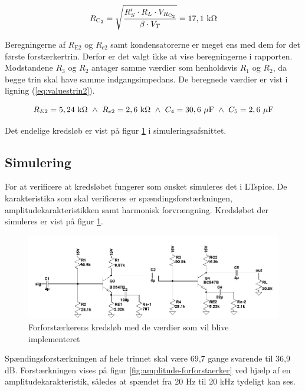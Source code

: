 \begin{equation}
R_{\mathrm{C_2}} = \sqrt{\frac{R'_S \cdot R_L \cdot V_{R_\mathrm{C_2}}}{\beta \cdot V_T}} = 17,1~\mathrm{k}\ohm
\label{eq:rc2maks}
\end{equation}

Beregningerne af $R_{\mathrm{E2}}$ og $R_{\mathrm{e2}}$ samt kondensatorerne er meget ens med dem for det første forstærkertrin. Derfor er det valgt ikke at vise beregningerne i rapporten. Modstandene $R_3$ og $R_2$ antager samme værdier som henholdsvis $R_1$ og $R_2$, da begge trin skal have samme indgangsimpedans. De beregnede værdier er vist i ligning (\ref{eq:valuestrin2}).

\begin{equation}
R_{E2}=5,24~\mathrm{k\ohm} ~ \wedge ~R_{e2}=2,6~\mathrm{k\ohm} ~ \wedge ~ C_4=30,6~\mathrm{\mu F} ~ \wedge ~ C_5=2,6~\mathrm{\mu F}
\label{eq:valuestrin2}
\end{equation}

Det endelige kredsløb er vist på figur \ref{fig:forforstaerkersimuleringkredslob} i simuleringsafsnittet.

\subsection*{Simulering}

For at verificere at kredsløbet fungerer som ønsket simuleres det i LTspice. De karakteristika som skal verificeres er spændingsforstærkningen, amplitudekarakteristikken samt harmonisk forvrængning. Kredsløbet der simuleres er vist på figur \ref{fig:forforstaerkersimuleringkredslob}. 

\begin{figure}[h]
\centering
\includegraphics[width=\textwidth]{teknisk/forforstaerker/forforstaerkerendeligkreds.png}
\caption{Forforstærkerens kredsløb med de værdier som vil blive implementeret}
\label{fig:forforstaerkersimuleringkredslob}
\end{figure}

Spændingsforstærkningen af hele trinnet skal være 69,7 gange svarende til 36,9 dB. Forstærkningen vises på figur \ref{fig:amplitude-forforstaerker} ved hjælp af en amplitudekarakteristik, således at spændet fra 20 Hz til 20 kHz tydeligt kan ses. 


